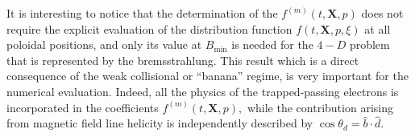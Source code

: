 It is interesting to notice that the determination of the $f^{\left(
m\right) }\left( t,\mathbf{X},p\right) $ does not require the explicit
evaluation of the distribution function $f\left( t,\mathbf{X},p,\xi\right) $
at all poloidal positions, and only its value at $B_{\min}$ is needed for
the $4-D$ problem that is represented by the bremsstrahlung. This result
which is a direct consequence of the weak collisional or ``banana'' regime,
is very important for the numerical evaluation. Indeed, all the physics of
the trapped-passing electrons is incorporated in the coefficients $f^{\left(
m\right) }\left( t,\mathbf{X},p\right) ,$ while the contribution arising
from magnetic field line helicity is independently described by $\cos
\theta_{d}=\widehat{b}\cdot\widehat{d}.$
